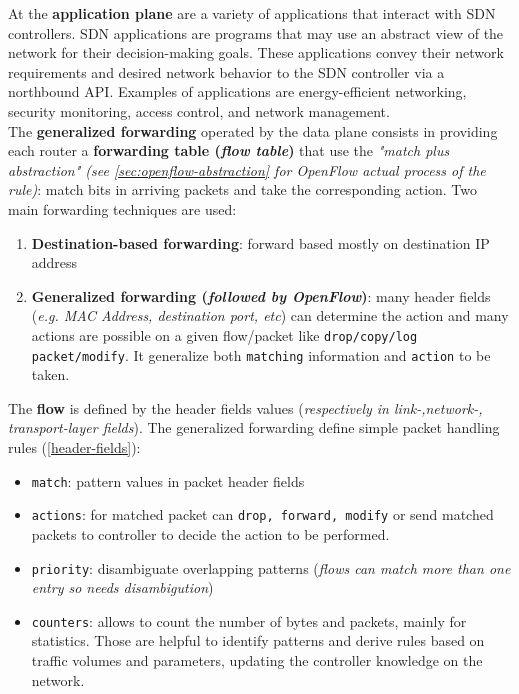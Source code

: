 \documentclass[10pt,a4paper]{report}
\theoremstyle{definition}
\begin{document}
At the \textbf{application plane} are a variety of applications that interact with SDN controllers. SDN applications are programs that may use an abstract view of the network for their decision-making goals. These applications convey their network requirements and desired network behavior to the SDN controller via a northbound API. Examples of applications are energy-efficient networking, security monitoring, access control, and network management.\\
The \textbf{generalized forwarding} operated by the data plane consists in providing each router a \textbf{forwarding table (\textit{flow table})} that use the \textit{"match plus abstraction" (see \ref{sec:openflow-abstraction} for OpenFlow actual process of the rule)}: match bits in arriving packets and take the corresponding action. Two main forwarding techniques are used:
\begin{enumerate}
	\item 
	\textbf{Destination-based forwarding}: forward based mostly on destination IP address
	\item 
	\textbf{Generalized forwarding (\textit{followed by OpenFlow})}: many header fields (\textit{e.g. MAC Address, destination port, etc}) can determine the action and many actions are possible on a given flow/packet like \texttt{drop/copy/log packet/modify}. It generalize both \texttt{matching} information and \texttt{action} to be taken.
	
\end{enumerate}
The \textbf{flow} is defined by the header fields values (\textit{respectively in link-,network-, transport-layer fields}). The generalized forwarding define simple packet handling rules (\ref{header-fields}):
\begin{itemize}
	\item 
	\texttt{match}: pattern values in packet header fields
	\item 
	\texttt{actions}: for matched packet can \texttt{drop, forward, modify} or send matched packets to controller to decide the action to be performed.
	\item 
	\texttt{priority}: disambiguate overlapping patterns (\textit{flows can match more than one entry so needs disambigution})
	\item 
	\texttt{counters}: allows to count the number of bytes and packets, mainly for statistics. Those are helpful to identify patterns and derive rules based on traffic volumes and parameters, updating the controller knowledge on the network.
\end{itemize}
\end{document}
